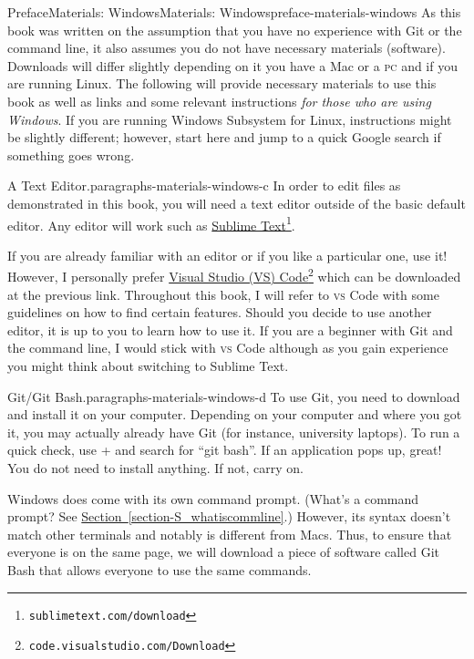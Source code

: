 \documentclass[oneside,10pt,]{book}
\newcommand{\xreffont}{\relax}
\newcommand{\initialism}[1]{\textsc{\MakeLowercase{#1}}}
\newcommand{\kbd}[1]{\keys{{#1}}}
\begin{document}
\begin{preface}{Preface}{Materials: Windows}{}{Materials: Windows}{}{}{preface-materials-windows}
As this book was written on the assumption that you have no experience with Git or the command line, it also assumes you do not have necessary materials (software). Downloads will differ slightly depending on it you have a Mac or a \initialism{PC} and if you are running Linux. The following will provide necessary materials to use this book as well as links and some relevant instructions \emph{for those who are using Windows}. If you are running Windows Subsystem for Linux, instructions might be slightly different; however, start here and jump to a quick Google search if something goes wrong.%
\begin{paragraphs}{A Text Editor.}{paragraphs-materials-windows-c}%
In order to edit files as demonstrated in this book, you will need a text editor outside of the basic default editor. Any editor will work such as \href{https://www.sublimetext.com/download}{Sublime Text}\footnote{\nolinkurl{sublimetext.com/download}\label{fn-materials-windows-c-b-b}}.%
\par
If you are already familiar with an editor or if you like a particular one, use it! However, I personally prefer \href{https://code.visualstudio.com/Download}{Visual Studio (VS) Code}\footnote{\nolinkurl{code.visualstudio.com/Download}\label{fn-materials-windows-c-c-b}} which can be downloaded at the previous link. Throughout this book, I will refer to \initialism{VS} Code with some guidelines on how to find certain features. Should you decide to use another editor, it is up to you to learn how to use it. If you are a beginner with Git and the command line, I would stick with \initialism{VS} Code although as you gain experience you might think about switching to Sublime Text.%
\end{paragraphs}%
\begin{paragraphs}{Git\slash{}Git Bash.}{paragraphs-materials-windows-d}%
To use Git, you need to download and install it on your computer. Depending on your computer and where you got it, you may actually already have Git (for instance, university laptops). To run a quick check, use \kbd{Windows} + \kbd{S} and search for ``git bash''. If an application pops up, great! You do not need to install anything. If not, carry on.%
\par
Windows does come with its own command prompt. (What's a command prompt? See \hyperref[section-S_whatiscommline]{Section~{\xreffont\ref{section-S_whatiscommline}}}.) However, its syntax doesn't match other terminals and notably is different from Macs. Thus, to ensure that everyone is on the same page, we will download a piece of software called Git Bash that allows everyone to use the same commands.%

\end{paragraphs}
\end{preface}
\end{document}
